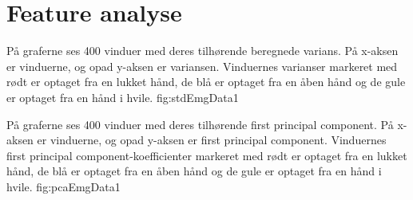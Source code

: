 \thispagestyle{fancy}




\chapter{Feature analyse}
{
	På graferne ses 400 vinduer med deres tilhørende beregnede varians. På x-aksen er vinduerne, og opad y-aksen er variansen. Vinduernes varianser markeret med rødt er optaget fra en lukket hånd, de blå er optaget fra en åben hånd og de gule er optaget fra en hånd i hvile.
 }{fig:stdEmgData}{1}
 
{
  På graferne ses 400 vinduer med deres tilhørende first principal component. På x-aksen er vinduerne, og opad y-aksen er first principal component. Vinduernes first principal component-koefficienter markeret med rødt er optaget fra en lukket hånd, de blå er optaget fra en åben hånd og de gule er optaget fra en hånd i hvile.
 }{fig:pcaEmgData}{1}
 
\newpage
\listoftables
\vspace{1cm}
\listoffigures
